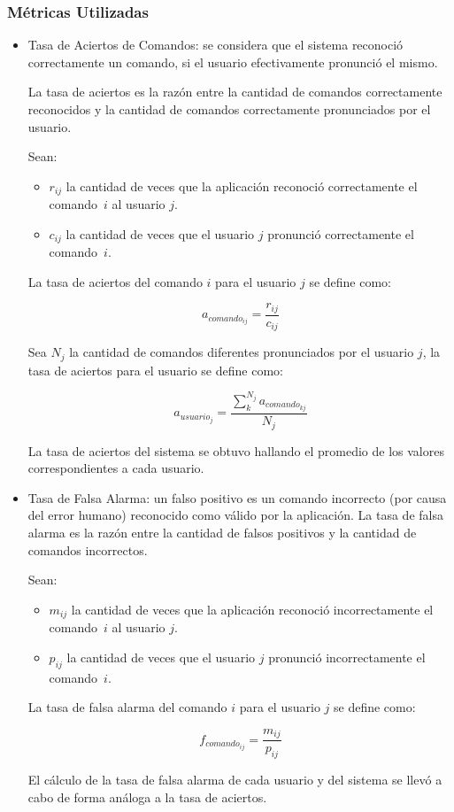 \subsubsection{Métricas Utilizadas}
\begin{itemize}
	\item Tasa de Aciertos de Comandos: se considera que el sistema reconoció correctamente
	un comando, si el usuario efectivamente pronunció el mismo.

	La tasa de aciertos es la razón entre la cantidad de comandos correctamente reconocidos 
	y la cantidad de comandos correctamente pronunciados por el usuario.
	
	Sean:

	\begin{itemize}
		\item $r_{ij}$ la cantidad de veces que la aplicación reconoció correctamente el \mbox{comando $i$}
		al usuario $j$.
		\item $c_{ij}$ la cantidad de veces que el usuario $j$ pronunció correctamente el \mbox{comando $i$.}
	\end{itemize}
	La tasa de aciertos del comando $i$ para el usuario $j$ se define como: 

	\begin{equation*}
		a_{{comando}_{ij}}=\frac{r_{ij}}{c_{ij}}
	\end{equation*}


	Sea $N_{j}$ la cantidad de comandos diferentes pronunciados por el usuario $j$,
	la tasa de aciertos para el usuario  se define como:
	
	\begin{equation*}
		a_{{usuario}_j}=\frac{\sum_k^{N_{j}}a_{{comando}_{kj}}}{N_{j}}
	\end{equation*}

	La tasa de aciertos del sistema se obtuvo hallando el promedio de los valores correspondientes
	a cada usuario.


	\item Tasa de Falsa Alarma: un falso positivo es un comando incorrecto (por causa del error humano)
	reconocido como válido por la aplicación.
	La tasa de falsa alarma es la razón entre la cantidad de falsos positivos y la cantidad
	de comandos incorrectos. 

	Sean:

	\begin{itemize}
		\item $m_{ij}$ la cantidad de veces que la aplicación reconoció incorrectamente el \mbox{comando $i$}
		al usuario $j$.
		\item $p_{ij}$ la cantidad de veces que el usuario $j$ pronunció incorrectamente el \mbox{comando $i$.}
	\end{itemize}
	La tasa de falsa alarma del comando $i$ para el usuario $j$ se define como: 

	\begin{equation*}
		f_{{comando}_{ij}}=\frac{m_{ij}}{p_{ij}}
	\end{equation*}

	El cálculo de la tasa de falsa alarma de cada usuario y del sistema se llevó a cabo de forma análoga 
	a la tasa de aciertos.
\end{itemize}

